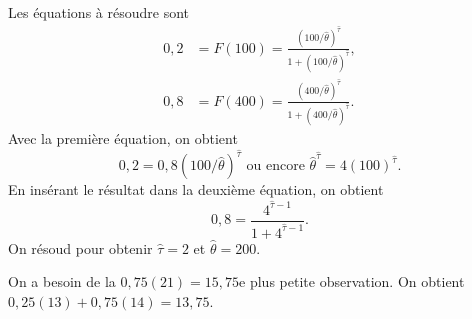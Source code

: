 \begin{solution}{4.6}
Les équations à résoudre sont
\begin{align*}
0,2 &= F(100) = \frac{(100/\hat{\theta})^{\hat{\tau}}}{1+(100/\hat{\theta})^{\hat{\tau}}}, \\
0,8 &= F(400) = \frac{(400/\hat{\theta})^{\hat{\tau}}}{1+(400/\hat{\theta})^{\hat{\tau}}}.
\end{align*}
Avec la première équation, on obtient
$$
0,2=0,8(100/\hat{\theta})^{\hat{\tau}} \text{ ou encore } \hat{\theta}^{\hat{\tau}}=4(100)^{\hat{\tau}}.
$$
En insérant le résultat dans la deuxième équation, on obtient
$$
0,8=\frac{4^{\hat{\tau}-1}}{1+4^{\hat{\tau}-1}}.
$$
On résoud pour obtenir $\hat{\tau}=2$ et $\hat{\theta}=200$.
\end{solution}
\begin{solution}{4.7}
On a besoin de la $0,75(21)=15,75$e plus petite observation. On obtient $0,25(13) + 0,75(14)= 13,75$.
\end{solution}
